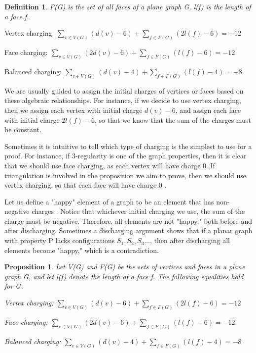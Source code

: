 \documentclass[a4paper, 11pt]{article} %
\newtheorem*{definition}{Definition}
\newtheorem{proposition}{Proposition}[section]
\begin{document}
\begin{definition}
F(G) is the set of all faces of a plane graph G. l(f) is the length of a face f. 
\end{definition}

Vertex charging: $\sum_{v\in V(G)} (d(v) - 6) + \sum_{f\in F(G)} (2l(f) - 6) = -12$

Face charging: $\sum_{v\in V(G)} (2d(v) - 6) + \sum_{f\in F(G)} (l(f) - 6) = -12$

Balanced charging: $\sum_{v\in V(G)} (d(v) - 4) + \sum_{f\in F(G)} (l(f) - 4) = -8$

We are usually guided to assign the initial charges of vertices or faces based on these algebraic relationships. For instance, if we decide to use vertex charging, then we assign each vertex with initial charge $d(v) - 6$, and assign each face with initial charge $2l(f) - 6$, so that we know that the sum of the charges must be constant. 

Sometimes it is intuitive to tell which type of charging is the simplest to use for a proof. For instance, if 3-regularity is one of the graph properties, then it is clear that we should use face charging, as each vertex will have charge 0. If triangulation is involved in the proposition we aim to prove, then we should use vertex charging, so that each face will have charge 0 \cite{cranston2013guide}.

Let us define a "happy" element of a graph to be an element that has non-negative charges \cite{cranston2013guide}. Notice that whichever initial charging we use, the sum of the charge must be negative. Therefore, all elements are not "happy," both before and after discharging. Sometimes a discharging argument shows that if a planar graph with property P lacks configurations $S_{1}, S_{2}, S_{3}$..., then after discharging all elements become "happy," which is a contradiction.
 
\begin{proposition}
\cite{cranston2013guide} Let V(G) and F(G) be the sets of vertices and faces in a plane graph G, and let l(f) denote the length of a face f. The following equalities hold for G.

Vertex charging: $\sum_{v\in V(G)} (d(v) - 6) + \sum_{f\in F(G)} (2l(f) - 6) = -12$

Face charging: $\sum_{v\in V(G)} (2d(v) - 6) + \sum_{f\in F(G)} (l(f) - 6) = -12$

Balanced charging: $\sum_{v\in V(G)} (d(v) - 4) + \sum_{f\in F(G)} (l(f) - 4) = -8$

\end{proposition}
\end{document}
